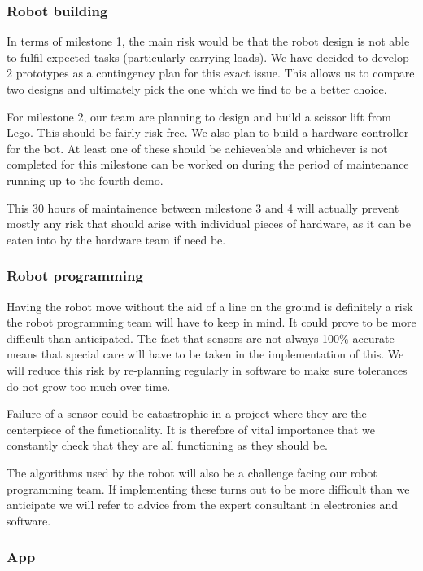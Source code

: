 \documentclass{article}
\begin{document}
\subsubsection{Robot building}

In terms of milestone 1, the main risk would be that the robot design is not able to fulfil expected tasks (particularly carrying loads). We have decided to develop 2 prototypes as a contingency plan for this exact issue. This allows us to compare two designs and ultimately pick the one which we find to be a better choice.

For milestone 2, our team are planning to design and build a scissor lift from Lego. This should be fairly risk free. We also plan to build a hardware controller for the bot. At least one of these should be achieveable and whichever is not completed for this milestone can be worked on during the period of maintenance running up to the fourth demo.

This 30 hours of maintainence between milestone 3 and 4 will actually prevent mostly any risk that should arise with individual pieces of hardware, as it can be eaten into by the hardware team if need be.

\subsubsection{Robot programming}

Having the robot move without the aid of a line on the ground is definitely a risk the robot programming team will have to keep in mind. It could prove to be more difficult than anticipated. The fact that sensors are not always 100\% accurate means that special care will have to be taken in the implementation of this. We will reduce this risk by re-planning regularly in software to make sure tolerances do not grow too much over time. 

Failure of a sensor could be catastrophic in a project where they are the centerpiece of the functionality. It is therefore of vital importance that we constantly check that they are all functioning as they should be.

The algorithms used by the robot will also be a challenge facing our robot programming team. If implementing these turns out to be more difficult than we anticipate we will refer to advice from the expert consultant in electronics and software.

\subsubsection{App}
\end{document}
